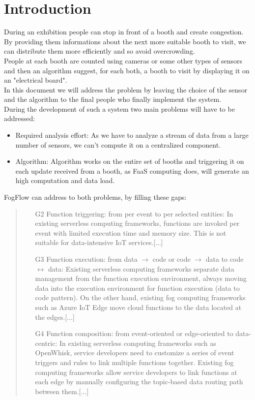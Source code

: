 \documentclass[conference]{ieeeconf}
\begin{document}
\section{Introduction}
During an exhibition people can stop in front of a booth and create congestion. By providing them informations about the next more suitable booth to visit, we can distribute them more efficiently and so avoid overcrowding.\\
People at each booth are counted using cameras or some other types of sensors and then an algorithm suggest, for each both, a booth to visit by displaying it on an "electrical board".\\
In this document we will address the problem by leaving the choice of the sensor and the algorithm to the final people who finally implement the system.\\
During the development of such a system two main problems will have to be addressed:
\begin{itemize}
    \item Required analysis effort: As we have to analyze a stream of data from a large number of sensors, we can't compute it on a centralized component.
    \item Algorithm: Algorithm works on the entire set of booths and triggering it on each update received from a booth, as FaaS computing does, will generate an high computation and data load.
\end{itemize}{}
FogFlow can address to both problems, by filling these gaps:
\begin{quote}
    \begin{enumerate}
        \item[G2] Function triggering: from per event to per selected entities: In existing serverless computing frameworks, functions are invoked per event with limited execution time and memory size. This is not suitable for data-intensive IoT services.[...]
        \item[G3] Function execution: from data $\rightarrow$ code or code $\rightarrow$ data to code $\leftrightarrow$ data: Existing serverless computing frameworks separate data management from the function execution environment, always moving data into the execution environment for function execution (data to code pattern). On the other hand, existing fog computing frameworks such as Azure IoT Edge move cloud functions to the data located at the edges.[...]
        \item[G4] Function composition: from event-oriented or edge-oriented to data-centric: 
        In existing serverless computing frameworks such as OpenWhisk, service developers need to customize a series of event triggers and rules to link multiple functions together. Existing fog computing frameworks allow service developers to link functions at each edge by manually configuring the topic-based data routing path between them.[...]
    \end{enumerate}{}
    \cite{cheng2019fog}
\end{quote}
\end{document}
